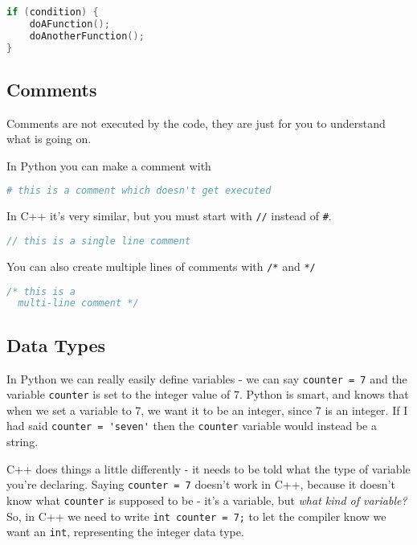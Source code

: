 \begin{lstlisting}[language={C++}]
if (condition) {
    doAFunction();
    doAnotherFunction();
}
\end{lstlisting}

\subsection{Comments}\label{comments}

Comments are not executed by the code, they are just for you to
understand what is going on.

In Python you can make a comment with

\begin{lstlisting}[language=Python]
# this is a comment which doesn't get executed
\end{lstlisting}

In C++ it's very similar, but you must start with \lstinline!//! instead
of \lstinline!#!.

\begin{lstlisting}[language={C++}]
// this is a single line comment
\end{lstlisting}

You can also create multiple lines of comments with \lstinline!/*! and
\lstinline!*/!

\begin{lstlisting}[language={C++}]
 /* this is a
  multi-line comment */
\end{lstlisting}

\subsection{Data Types}\label{data-types}

In Python we can really easily define variables - we can say
\lstinline!counter = 7! and the variable \lstinline!counter! is set to
the integer value of 7. Python is smart, and knows that when we set a
variable to 7, we want it to be an integer, since 7 is an integer. If I
had said \lstinline!counter = 'seven'! then the \lstinline!counter!
variable would instead be a string.

C++ does things a little differently - it needs to be told what the type
of variable you're declaring. Saying \lstinline!counter = 7! doesn't
work in C++, because it doesn't know what \lstinline!counter! is
supposed to be - it's a variable, but \emph{what kind of variable?} So,
in C++ we need to write \lstinline!int counter = 7;! to let the compiler
know we want an \lstinline!int!, representing the integer data type.

